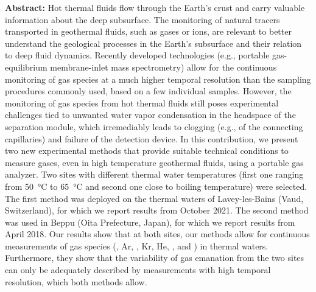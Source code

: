 \newpage
\noindent
\textbf{Abstract:} Hot thermal fluids flow through the Earth's crust and carry valuable information about the deep subsurface.
The monitoring of natural tracers transported in geothermal fluids, such as gases or ions, are relevant to better understand the geological processes in the Earth's subsurface and their relation to deep fluid dynamics.
Recently developed technologies (e.g., portable gas-equilibrium membrane-inlet mass spectrometry) allow for the continuous monitoring of gas species at a much higher temporal resolution than the sampling procedures commonly used, based on a few individual samples. 
However, the monitoring of gas species from hot thermal fluids still poses experimental challenges tied to unwanted water vapor condensation in the headspace of the separation module, which irremediably leads to clogging (e.g., of the connecting capillaries) and failure of the detection device. 
In this contribution, we present two new experimental methods that provide suitable technical conditions to measure gases, even in high temperature geothermal fluids, using a portable gas analyzer. 
Two sites with different thermal water temperatures (first one ranging from \SI{50}{\celsius} to \SI{65}{\celsius} and second one close to boiling temperature) were selected.
The first method was deployed on the thermal waters of Lavey-les-Bains (Vaud, Switzerland), for which we report results from October 2021.
The second method was used in Beppu (Oita Prefecture, Japan), for which we report results from April 2018.
Our results show that at both sites, our methods allow for continuous measurements of gas species (, Ar, , Kr, He, ,  and ) in thermal waters.
Furthermore, they show that the variability of gas emanation from the two sites can only be adequately described by measurements with high temporal resolution, which both methods allow. 

